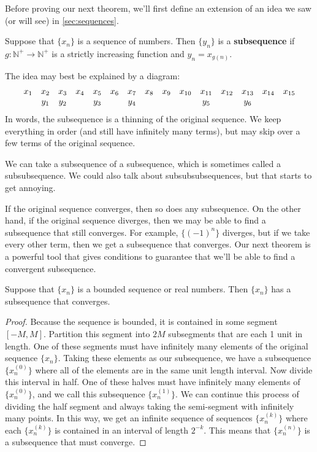 Before proving our next theorem, we'll first define an extension of an idea we saw (or will see) in \autoref{sec:sequences}.

\begin{definition}[Subsequence]\label{def:subsequence}%
Suppose that $\{x_n\}$ is a sequence of numbers.  Then $\{y_n\}$ is a \textbf{subsequence} if $g:\mathbb{N}^+\to\mathbb{N}^+$ is a strictly increasing function and $y_n=x_{g(n)}$.
\end{definition}

The idea may best be explained by a diagram:
\[
\begin{array}{ c c c c c c c c c c c c c c c }
 x_1 & x_2 & x_3 & x_4 & x_5 & x_6 & x_7 & x_8 & x_9 & x_{10} & x_{11} & x_{12} & x_{13} & x_{14} & x_{15} \\
 & y_1 & y_2 & & y_3 & & y_4 & & & & y_5 & & y_6 & &
\end{array}
\]
In words, the subsequence is a thinning of the original sequence.  We keep everything in order (and still have infinitely many terms), but may skip over a few terms of the original sequence.

We can take a subsequence of a subsequence, which is sometimes called a subsubsequence.  We could also talk about subsubsubsequences, but that starts to get annoying.

If the original sequence converges, then so does any subsequence.  On the other hand, if the original sequence diverges, then we may be able to find a subsequence that still converges.  For example, $\{(-1)^n\}$ diverges, but if we take every other term, then we get a subsequence that converges.  Our next theorem is a powerful tool that gives conditions to guarantee that we'll be able to find a convergent subsequence.

\begin{theorem}\label{thm:bolzanoWeierstrass}%
Suppose that $\{x_n\}$ is a bounded sequence or real numbers.  Then $\{x_n\}$ has a subsequence that converges.
\end{theorem}

\begin{proof}
Because the sequence is bounded, it is contained in some segment $[-M,M]$.
Partition this segment into $2M$ subsegments that are each 1 unit in length.  One of these segments must have infinitely many elements of the original sequence $\{x_n\}$.  Taking these elements as our subsequence, we have a subsequence $\{x_n^{(0)}\}$ where all of the elements are in the same unit length interval.  Now divide this interval in half.  One of these halves must have infinitely many elements of $\{x_n^{(0)}\}$, and we call this subsequence $\{x_n^{(1)}\}$.  We can continue this process of dividing the half segment and always taking the semi-segment with infinitely many points.  In this way, we get an infinite sequence of sequences $\{x_n^{(k)}\}$ where each $\{x_n^{(k)}\}$ is contained in an interval of length $2^{-k}$.  This means that $\{x_n^{(n)}\}$ is a subsequence that must converge.
\end{proof}

